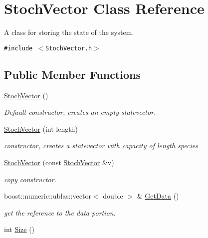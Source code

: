 \hypertarget{class_stoch_vector}{
\section{StochVector Class Reference}
\label{class_stoch_vector}
}
A class for storing the state of the system.  


{\tt \#include $<$StochVector.h$>$}

\subsection*{Public Member Functions}
\begin{CompactItemize}
\item 
\hyperlink{class_stoch_vector_6911dc16546876d0038fa3931832f812}{StochVector} ()
\begin{CompactList}\small\item\em Default constructor, creates an empty statevector. \item\end{CompactList}\item 
\hyperlink{class_stoch_vector_e9a5e048a9d55ec742b3a5ec35756143}{StochVector} (int length)
\begin{CompactList}\small\item\em constructor, creates a statevector with capacity of length species \item\end{CompactList}\item 
\hyperlink{class_stoch_vector_42077b66e21408ccf8daebe6309c4020}{StochVector} (const \hyperlink{class_stoch_vector}{StochVector} \&v)
\begin{CompactList}\small\item\em copy constructor. \item\end{CompactList}\item 
\hypertarget{class_stoch_vector_d6bf7080eb5d4d4ba31502a37d497177}{
boost::numeric::ublas::vector$<$ double $>$ \& \hyperlink{class_stoch_vector_d6bf7080eb5d4d4ba31502a37d497177}{GetData} ()}
\label{class_stoch_vector_d6bf7080eb5d4d4ba31502a37d497177}

\begin{CompactList}\small\item\em get the reference to the data portion. \item\end{CompactList}\item 
\hypertarget{class_stoch_vector_ace6308580e0c86cee76f7d76666467e}{
int \hyperlink{class_stoch_vector_ace6308580e0c86cee76f7d76666467e}{Size} ()}
\label{class_stoch_vector_ace6308580e0c86cee76f7d76666467e}


\end{CompactItemize}
